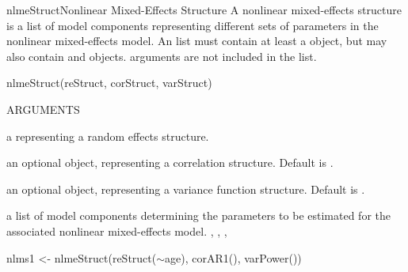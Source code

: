 \documentclass[pdftex]{article} \usepackage{url,graphicx}
\renewcommand{\Twiddle}{\mbox{\(\sim\)}}
\begin{document}
\begin{Helpfile}{nlmeStruct}{Nonlinear Mixed-Effects Structure}
A nonlinear mixed-effects structure is a list of model components
representing different sets of parameters in the nonlinear mixed-effects
model. An  list must contain at least a
 object, but may also contain  and
 objects.  arguments are not included in the
 list.
\begin{Example}
nlmeStruct(reStruct, corStruct, varStruct)
\end{Example}
\begin{Argument}{ARGUMENTS}
\item[\Co{reStruct:}]
a  representing a random effects
structure.
\item[\Co{corStruct:}]
an optional  object, representing a
correlation structure. Default is .
\item[\Co{varStruct:}]
an optional  object, representing a
variance function structure. Default is .
\end{Argument}
a list of model components determining the parameters to be estimated
for the associated nonlinear mixed-effects model.
, ,
, 
\need 15pt
\vspace{-16pt}
\begin{Example}
nlms1 <- nlmeStruct(reStruct({\Twiddle}age), corAR1(), varPower())
\end{Example}
\end{Helpfile}
\end{document}
